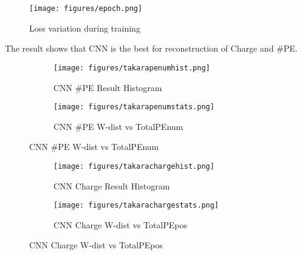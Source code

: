 \begin{figure}[H]
    \centering
    \texttt{[image: figures/epoch.png]}
    \caption{\label{fig:loss} Loss variation during training}
\end{figure}

The result shows that CNN is the best for reconstruction of Charge and \#PE. 

\begin{figure}[H]
\begin{minipage}{.5\textwidth}
\begin{figure}[H]
    \centering
        \texttt{[image: figures/takarapenumhist.png]}
    \caption{CNN \#PE Result Histogram}
\end{figure}
\end{minipage}
\begin{minipage}{.5\textwidth}
\begin{figure}[H]
    \centering
        \texttt{[image: figures/takarapenumstats.png]}
    \caption{CNN \#PE W-dist vs TotalPEnum}
\end{figure}
\end{minipage}
\end{figure}
\begin{figure}[H]
\begin{minipage}{.5\textwidth}
\begin{figure}[H]
    \centering
        \texttt{[image: figures/takarachargehist.png]}
    \caption{CNN Charge Result Histogram}
\end{figure}
\end{minipage}
\begin{minipage}{.5\textwidth}
\begin{figure}[H]
    \centering
        \texttt{[image: figures/takarachargestats.png]}
    \caption{CNN Charge W-dist vs TotalPEpos}
\end{figure}
\end{minipage}
\end{figure}


